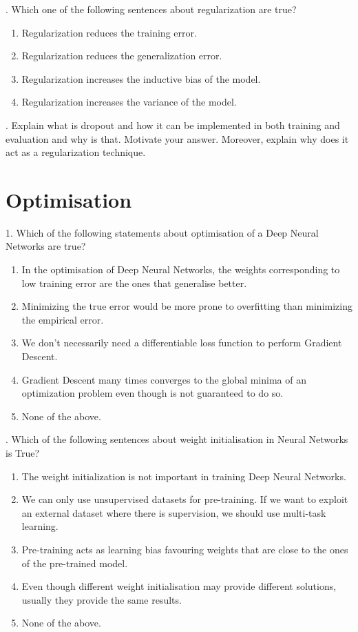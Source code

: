 . Which one of the following sentences about regularization are true?

\begin{enumerate}[label=\roman*]
    \item Regularization reduces the training error.
    \item Regularization reduces the generalization error.
    \item Regularization increases the inductive bias of the model.
    \item Regularization increases the variance of the model.
\end{enumerate}

. Explain what is dropout and how it can be implemented in both training and evaluation and why is that. Motivate your answer. Moreover, explain why does it act as a regularization technique.

\section{Optimisation}

1. Which of the following statements about optimisation of a Deep Neural Networks are true?

\begin{enumerate}[label=\roman*]
    \item In the optimisation of Deep Neural Networks, the weights corresponding to low training error are the ones that generalise better.
    \item Minimizing the true error would be more prone to overfitting than minimizing the empirical error.
    \item We don't necessarily need a differentiable loss function to perform Gradient Descent.
    \item Gradient Descent many times converges to the global minima of an optimization problem even though is not guaranteed to do so.
    \item None of the above.
\end{enumerate}

. Which of the following sentences about weight initialisation in Neural Networks is True?

\begin{enumerate}[label=\roman*]
    \item The weight initialization is not important in training Deep Neural Networks.
    \item We can only use unsupervised datasets for pre-training. If we want to exploit an external dataset where there is supervision, we should use multi-task learning.
    \item Pre-training acts as learning bias favouring weights that are close to the ones of the pre-trained model.
    \item Even though different weight initialisation may provide different solutions, usually they provide the same results.
    \item None of the above.
\end{enumerate}

